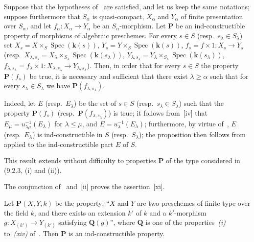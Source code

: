 \begin{proposition}[9.3.3]
\label{IV.9.3.3}
Suppose that the hypotheses of~ are satisfied, and let us keep the same notations; suppose furthermore that $S_\alpha$ is quasi-compact, $X_\alpha$ and $Y_\alpha$ of finite presentation over $S_\alpha$, and let $f_\alpha:X_\alpha\to Y_\alpha$ be an $S_\alpha$-morphism.
Let $\mathbf{P}$ be an ind-constructible property of morphisms of algebraic preschemes.
For every $s\in S$ \textnormal{(}resp.\ $s_\lambda\in S_\lambda$\textnormal{)} set $X_s=X\times_S\operatorname{Spec}(\mathbf{k}(s))$, $Y_s=Y\times_S\operatorname{Spec}(\mathbf{k}(s))$, $f_s=f\times 1:X_s\to Y_s$ \textnormal{(}resp.\ $X_{\lambda,s_\lambda}=X_\lambda\times_{S_\lambda}\operatorname{Spec}(\mathbf{k}(s_\lambda))$, $Y_{\lambda,s_\lambda}=Y_\lambda\times_{S_\lambda}\operatorname{Spec}(\mathbf{k}(s_\lambda))$, $f_{\lambda,s_\lambda}=f_\lambda\times 1:X_{\lambda,s_\lambda}\to Y_{\lambda,s_\lambda}$\textnormal{)}.
Then, in order that for every $s\in S$ the property $\mathbf{P}(f_s)$ be true, it is necessary and sufficient that there exist $\lambda\geqslant\alpha$ such that for every $s_\lambda\in S_\lambda$ we have $\mathbf{P}(f_{\lambda,s_\lambda})$.
\end{proposition}

Indeed, let $E$ (resp.\ $E_\lambda$) be the set of $s\in S$ (resp.\ $s_\lambda\in S_\lambda$) such that the property $\mathbf{P}(f_s)$ (resp.\ $\mathbf{P}(f_{\lambda,s_\lambda})$) is true; it follows from~[iv] that $E_\mu=u_{\lambda\mu}^{-1}(E_\lambda)$ for $\lambda\leqslant\mu$, and $E=u_\lambda^{-1}(E_\lambda)$; furthermore, by virtue of~, $E$ (resp.\ $E_\lambda$) is ind-constructible in $S$ (resp.\ $S_\lambda$); the proposition then follows from~ applied to the ind-constructible part $E$ of $S$.


This result extends without difficulty to properties $\mathbf{P}$ of the type considered in (9.2.3, (i) and (ii)).

\begin{remark}[9.3.4]
\label{IV.9.3.4}
The conjunction of~ and~[ii] proves the assertion~[xi].
\end{remark}

\begin{proposition}[9.3.5]
\label{IV.9.3.5}
Let $\mathbf{P}(X,Y,k)$ be the property: ``$X$ and $Y$ are two preschemes of finite type over the field $k$, and there exists an extension $k'$ of $k$ and a $k'$-morphism $g:X_{(k')}\to Y_{(k')}$ satisfying $\mathbf{Q}(g)$'', where $\mathbf{Q}$ is one of the properties~\emph{(i)} to~\emph{(xiv)} of~.
Then $\mathbf{P}$ is an ind-constructible property.
\end{proposition}

